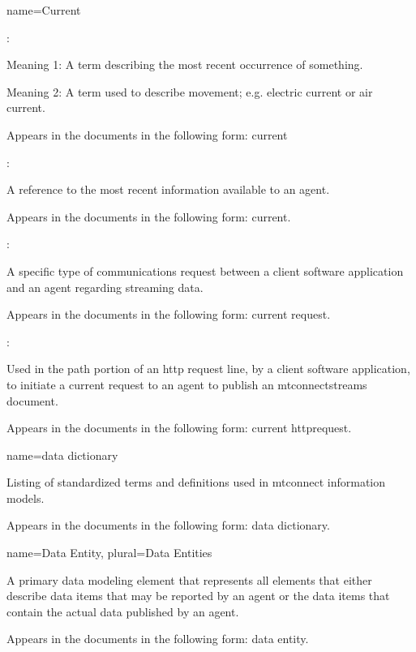{
  name={Current}
}
{
	:

	Meaning 1:  A term describing the most recent occurrence of something.

	Meaning 2:  A term used to describe movement; e.g. electric current or air current.

	Appears in the documents in the following form: current

	:

	A reference to the most recent information available to an \gls{agent}.

	Appears in the documents in the following form: current.

	:

	A specific type of communications request between a client software application and an \gls{agent} regarding \gls{streaming data}.  

	Appears in the documents in the following form: \gls{current request}.

	:

	Used in the path portion of an \gls{http request line}, by a client software application, to initiate a \gls{current request} to an \gls{agent} to publish an \gls{mtconnectstreams} document.

	Appears in the documents in the following form: \gls{current httprequest}.
}


{
  name={data dictionary}
}
{
	Listing of standardized terms and definitions used in \glspl{mtconnect information model}.

	Appears in the documents in the following form: \gls{data dictionary}.
}


{
  name={Data Entity},
  plural={Data Entities}
}
{
	A primary data modeling element that represents all elements that either describe data items that may be reported by an \gls{agent} or the data items that contain the actual data published by an \gls{agent}.

	Appears in the documents in the following form: \gls{data entity}.
}



